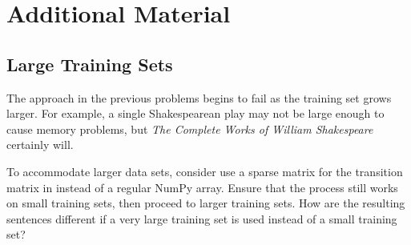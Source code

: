\section*{Additional Material} %

\subsection*{Large Training Sets} %

The approach in the previous problems begins to fail as the training set grows larger.
For example, a single Shakespearean play may not be large enough to cause memory problems, but \emph{The Complete Works of William Shakespeare} certainly will.

To accommodate larger data sets, consider use a sparse matrix for the transition matrix in instead of a regular NumPy array. %
Ensure that the process still works on small training sets, then proceed to larger training sets.
How are the resulting sentences different if a very large training set is used instead of a small training set?


